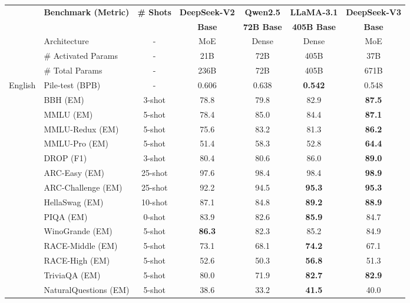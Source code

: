 \documentclass[11pt, a4paper, logo, copyright, nonumbering]{deepseek}
\newcommand{\dsvii}{DeepSeek-V2}
\newcommand{\dsviii}{DeepSeek-V3}
\begin{document}
\begin{CJK*}{UTF8}{gbsn}
\begin{table}[!h]
    \centering
    \footnotesize
    \setlength{\tabcolsep}{4.5pt}
    \begin{tabular}{@{}c l c | c | c c | c@{}}
    \toprule
    & \multirow{2}{*}{\centering \textbf{Benchmark {\tiny (Metric)}}} & \multirow{2}{*}{\textbf{\# Shots}} & \textbf{\dsvii{}} & \textbf{Qwen2.5} & \textbf{LLaMA-3.1} & \textbf{\dsviii{}} \\
    & & & \textbf{Base} & \textbf{72B Base} & \textbf{405B Base} & \textbf{Base} \\
    \midrule
    & Architecture & - & MoE & Dense & Dense & MoE \\
    & \# Activated Params & - & 21B & 72B & 405B & 37B \\
    & \# Total Params & - & 236B & 72B & 405B & 671B \\
    \midrule
    \multirow{16}{*}{English} & Pile-test {\tiny (BPB)} & - & 0.606 & 0.638 & \textbf{0.542} & 0.548 \\
    & BBH {\tiny (EM)} & 3-shot & 78.8 & 79.8 & 82.9 & \textbf{87.5} \\
    & MMLU {\tiny (EM)} & 5-shot & 78.4 & 85.0 & 84.4 & \textbf{87.1} \\
    & MMLU-Redux {\tiny (EM)} & 5-shot & 75.6 & 83.2 & 81.3 & \textbf{86.2} \\
    & MMLU-Pro {\tiny (EM)} & 5-shot & 51.4 & 58.3 & 52.8 & \textbf{64.4} \\
    & DROP {\tiny (F1)} & 3-shot & 80.4 & 80.6 & 86.0 & \textbf{89.0} \\
    & ARC-Easy {\tiny (EM)} & 25-shot & 97.6 & 98.4 & 98.4 & \textbf{98.9} \\
    & ARC-Challenge {\tiny (EM)} & 25-shot & 92.2 & 94.5 & \textbf{95.3} & \textbf{95.3} \\
    & HellaSwag {\tiny (EM)} & 10-shot & 87.1 & 84.8 & \textbf{89.2} & \textbf{88.9} \\
    & PIQA {\tiny (EM)} & 0-shot & 83.9 & 82.6 & \textbf{85.9} & 84.7 \\
    & WinoGrande {\tiny (EM)} & 5-shot & \textbf{86.3} & 82.3 & 85.2 & 84.9 \\
    & RACE-Middle {\tiny (EM)} & 5-shot & 73.1 & 68.1 & \textbf{74.2} & 67.1 \\
    & RACE-High {\tiny (EM)} & 5-shot & 52.6 & 50.3 & \textbf{56.8} & 51.3 \\
    & TriviaQA {\tiny (EM)} & 5-shot & 80.0 & 71.9 & \textbf{82.7} & \textbf{82.9} \\
    & NaturalQuestions {\tiny (EM)} & 5-shot & 38.6 & 33.2 & \textbf{41.5} & 40.0 \\

\end{tabular}
\end{table}
\end{CJK*}
\end{document}
